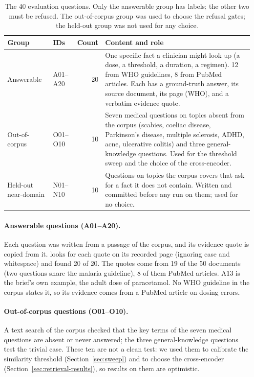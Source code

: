 \begin{table}[htbp]
\centering
\caption{The 40 evaluation questions. Only the answerable group has labels; the other two must be refused. The out-of-corpus group was used to choose the refusal gates; the held-out group was not used for any choice.}
\label{tab:evalset}
\small
\begin{tabularx}{\linewidth}{@{}llrX@{}}
\toprule
Group & IDs & Count & Content and role \\
\midrule
Answerable & A01--A20 & 20 & One specific fact a clinician might look up (a dose, a threshold, a duration, a regimen). 12 from WHO guidelines, 8 from PubMed articles. Each has a ground-truth answer, its source document, its page (WHO), and a verbatim evidence quote. \\
Out-of-corpus & O01--O10 & 10 & Seven medical questions on topics absent from the corpus (scabies, coeliac disease, Parkinson's disease, multiple sclerosis, ADHD, acne, ulcerative colitis) and three general-knowledge questions. Used for the threshold sweep and the choice of the cross-encoder. \\
Held-out near-domain & N01--N10 & 10 & Questions on topics the corpus covers that ask for a fact it does not contain. Written and committed before any run on them; used for no choice. \\
\bottomrule
\end{tabularx}
\end{table}

\paragraph{Answerable questions (A01--A20).} Each question was written from a passage of the corpus, and its evidence quote is copied from it.  looks for each quote on its recorded page (ignoring case and whitespace) and found 20 of 20. The quotes come from 19 of the 50 documents (two questions share the malaria guideline), 8 of them PubMed articles. A13 is the brief's own example, the adult dose of paracetamol. No WHO guideline in the corpus states it, so its evidence comes from a PubMed article on dosing errors.

\paragraph{Out-of-corpus questions (O01--O10).} A text search of the corpus checked that the key terms of the seven medical questions are absent or never answered; the three general-knowledge questions test the trivial case. These ten are not a clean test: we used them to calibrate the similarity threshold (Section~\ref{sec:sweep}) and to choose the cross-encoder (Section~\ref{sec:retrieval-results}), so results on them are optimistic.

